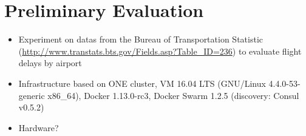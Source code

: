 \section{Preliminary Evaluation}
\label{sec:eval}

\begin{itemize}
  \item Experiment on datas from the Bureau of Transportation Statistic (\url{http://www.transtats.bts.gov/Fields.asp?Table_ID=236}) to evaluate flight delays by airport
  \item Infrastructure based on ONE cluster, VM 16.04 LTS (GNU/Linux 4.4.0-53-generic x86\_64), Docker 1.13.0-rc3, Docker Swarm 1.2.5 (discovery: Consul v0.5.2)
  \item Hardware?
\end{itemize}

